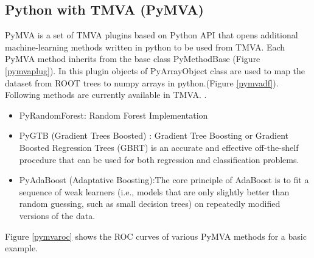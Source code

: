 \documentclass[a4paper]{jpconf}
\begin{document}
\subsection{Python with TMVA (PyMVA)} \label{PYMVA}
PyMVA is a set of TMVA plugins based on Python API that opens additional machine-learning methods written in python to be used from TMVA. Each PyMVA method inherits from the base class PyMethodBase (Figure \ref{pymvaplug}). In this plugin objects of PyArrayObject class are used to map the dataset from ROOT trees to numpy arrays in python.(Figure \ref{pymvadf}). Following methods are currently available in TMVA. \cite{pedregosa2011scikit}.

\begin{itemize}

\item PyRandomForest: Random Forest Implementation

\item PyGTB (Gradient Trees Boosted) : Gradient Tree Boosting or Gradient Boosted Regression Trees (GBRT) is an accurate and effective off-the-shelf procedure that can be used for both regression and classification problems.

\item PyAdaBoost (Adaptative Boosting):The core principle of AdaBoost is to fit a sequence of weak learners (i.e., models that are only slightly better than random guessing, such as small
decision trees) on repeatedly modified versions of the data. 

\end{itemize}



Figure \ref{pymvaroc} shows the ROC curves of various PyMVA methods for a basic example.
\end{document}
